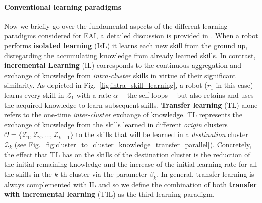 \documentclass[12pt]{article}
\renewcommand{\emph}[1]{\textit{#1}}
\begin{document}
\paragraph*{Conventional learning paradigms} Now we briefly go over the fundamental aspects of the different learning paradigms considered for EAI, a detailed discussion is provided in . When a robot performs \textbf{isolated learning} (IsL) it learns each new skill from the ground up, disregarding the accumulating knowledge from already learned skills. In contrast, \textbf{incremental Learning} (IL) corresponds to the continuous aggregation and exchange of knowledge from \emph{intra-cluster} skills in virtue of their significant similarity. As depicted in Fig.~\ref{fig:intra_skill_learning}, a robot ($r_1$ in this case) learns every skill in $\mathcal{Z}_1$ with a rate $\alpha$ ---the self loops--- but also retains and uses the acquired knowledge to learn subsequent skills. \textbf{Transfer learning} (TL) alone refers to the one-time \emph{inter-cluster} exchange of knowledge. TL represents the exchange of knowledge from the skills learned in different \emph{origin} clusters $\mathcal{O} = \{ \mathcal{Z}_1,\mathcal{Z}_2,\ldots,\mathcal{Z}_{k-1} \}$ to the skills that will be learned in a \emph{destination} cluster $\mathcal{Z}_k$ (see Fig.~\ref{fig:cluster_to_cluster_knowledge_transfer_parallel}). Concretely, the effect that TL has on the skills of the destination cluster is the reduction of the initial remaining knowledge and the increase of the initial learning rate for all the skills in the $k$-th cluster via the parameter $\beta_k$. In general, transfer learning is always complemented with IL and so we define the combination of both \textbf{transfer with incremental learning} (TIL) as the third learning paradigm. 

\end{document}

